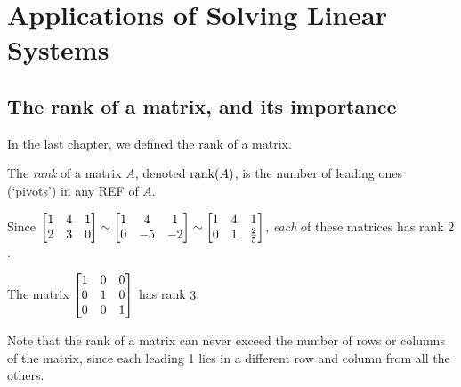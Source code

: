 \chapter{Applications of Solving Linear Systems}\label{chapter:13applications}

\section{The rank of a matrix, and its importance}

In the last chapter, we defined the rank of a matrix.

\begin{definition}  The \emph{rank} of a matrix $A$, denoted $\textrm{rank}(A)$, is the number of leading ones (`pivots') in any REF of $A$.
\end{definition}

\begin{myexample} Since  $\left[ \begin{matrix} 1 & 4 & 1 \\ 2 & 3 & 0 \end{matrix} \right] \sim \left[ \begin{matrix} 1 & 4 & 1 \\ 0 & -5 & -2 \end{matrix} \right] \sim \left[ \begin{matrix} 1 & 4  & 1\\ 0 & 1  & \frac25 \end{matrix} \right]$, \emph{each} of these matrices has rank $2$. \end{myexample}


\begin{myexample} The matrix $\left[ \begin{matrix} 1 & 0 & 0 \\ 0 & 1 & 0 \\ 0 & 0 & 1 \end{matrix} \right]$ has rank $3$.\end{myexample}

Note that the rank of a matrix can never exceed the number of rows or 
columns of the matrix, since each leading 1 lies in a different
row and column from all the others.

